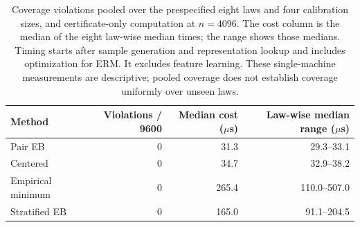 \begin{table}[t]
\centering\small
\begin{tabular}{lrrr}
\toprule
Method & Violations / 9600 & Median cost ($\mu$s) & Law-wise median range ($\mu$s) \\
\midrule
Pair EB & 0 & 31.3 & 29.3--33.1 \\
Centered & 0 & 34.7 & 32.9--38.2 \\
Empirical minimum & 0 & 265.4 & 110.0--507.0 \\
Stratified EB & 0 & 165.0 & 91.1--204.5 \\
\bottomrule
\end{tabular}
\caption{Coverage violations pooled over the prespecified eight laws and four calibration sizes, and certificate-only computation at $n=4096$. The cost column is the median of the eight law-wise median times; the range shows those medians. Timing starts after sample generation and representation lookup and includes optimization for ERM. It excludes feature learning. These single-machine measurements are descriptive; pooled coverage does not establish coverage uniformly over unseen laws.}
\label{tab:witness-cost}
\end{table}

